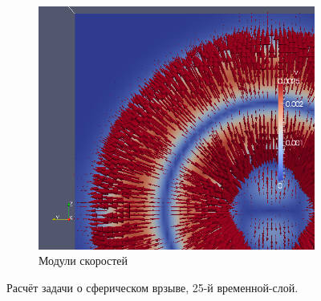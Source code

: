 \begin{figure}[htp]
\begin{subfigure}[b]{0.5\textwidth}
\includegraphics[width=\textwidth]{png/v-vector-0025.png}
\caption{Модули скоростей}
\end{subfigure}
\caption{Расчёт задачи о сферическом врзыве, 25-й временной-слой.}
\label{pic:spherical_25}
\end{figure}
